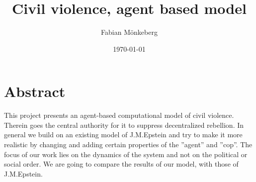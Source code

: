 \documentclass{article}
\title{Civil violence, agent based model}
\author{Fabian M\"onkeberg}
\date{\today}
\begin{document}
\maketitle



\section{Abstract}

This project presents an agent-based computational model of civil violence. Therein goes the central authority for it to suppress decentralized  rebellion. In general we build on an existing model of J.M.Epstein and try to make it more realistic by changing and adding certain properties of the ''agent'' and ''cop''. The focus of our work lies on the dynamics of the system and not on the political or social order. We are going to compare the results of our model, with those of J.M.Epstein.
\end{document}
